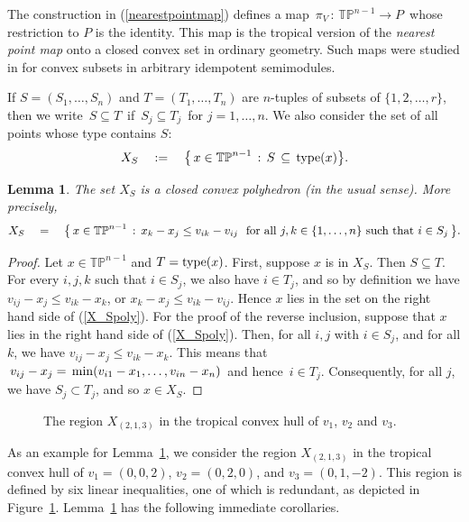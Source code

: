 \documentclass[11pt]{amsart}
\newtheorem{lem}[thm]{Lemma}
\newcommand{\TP}{\mathbb{TP}}
\begin{document}
The construction in (\ref{nearestpointmap})
defines a map $\,\pi_V \,: \, \TP^{n-1} \rightarrow P \,$
whose restriction to $P$ is the identity.
This map is the tropical version of the
\emph{nearest point map} onto a closed convex set
in ordinary geometry. Such maps were studied
in \cite{CGQ} for convex subsets in arbitrary idempotent semimodules.

If $S = (S_1,\ldots,S_n)$ 
and $T = (T_1,\ldots,T_n)$ are $n$-tuples
of subsets of $\{1,2,\ldots,r\}$, then we write
$\, S \subseteq T \,$ if $\, S_j \subseteq T_j \,$
for $j=1,\ldots,n$. We also
consider the set of all points whose type contains $S$:
$$ X_S \quad := \quad \bigl\{\,
x \in \TP^{n-1} \, : \, S \,\subseteq \,{\rm type}(x)\bigr\}. $$

\begin{lem}\label{ineqs}
The set $X_S$ is a closed convex polyhedron
(in the usual sense). More precisely,
\begin{equation}
\label{X_Spoly}
 X_S \quad = \quad \bigl\{\,
x \in \TP^{n-1} \,:\,
 x_k-x_j \le v_{ik}-v_{ij}  \,\,\,\,
\hbox{for all} \,\, 
j,k \in \{ 1,\ldots,n\} \,\,
\hbox{such that} \,\, i \in S_j \,\bigr\} .
\end{equation}
\end{lem}

\begin{proof}
Let $x \in \TP^{n-1}$ and $T = {\rm type}(x)$.
First, suppose $x$ is in $X_S$. Then $S \subseteq T$.
For every $i,j,k$ such that 
$i\in 
S_j$, we also have $i\in T_j$, and so by definition we have $v_{ij}-x_j \le v_{ik}-x_k$, or 
$x_k-x_j\le v_{ik}-v_{ij}$. Hence $x$ lies in the
set on the right hand side of (\ref{X_Spoly}).
For the proof of the reverse inclusion,
suppose that $x$ lies in the right hand side of 
(\ref{X_Spoly}).
Then, for all $i,j$ with $i\in S_j$, and for all $k$, we have  
$v_{ij}-x_j\le v_{ik}-x_k$. This means that
$\,v_{ij}-x_j =\,{\rm  min}(v_{i1}-x_1,\ldots,v_{in}-x_n)\,$
and hence $\,i\in T_j$. Consequently, for 
all $j$, we have $S_j\subset T_j$, and so $x\in X_S$.
\end{proof}

\begin{figure}
 
\caption{\label{reg213}
The region $X_{(2,1,3)}$ in the tropical convex hull of 
$v_1$, $v_2$ and $v_3$.}
\end{figure}

As an example for Lemma~\ref{ineqs}, we 
consider the region $X_{(2,1,3)}$ in
the tropical convex hull of $v_1=(0,0,2)$, $v_2=(0,2,0)$, and $v_3=(0,1,-2)$. 
This region is defined by six linear inequalities, one of which is redundant, as depicted in Figure~\ref{reg213}.
Lemma~\ref{ineqs} has the following 
immediate corollaries.
\end{document}
